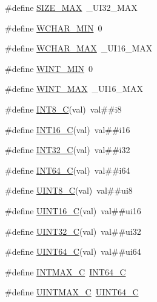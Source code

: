 \begin{DoxyCompactItemize}
\item 
\#define \hyperlink{lib-src_2ffmpeg_2win32_2stdint_8h_a3c75bb398badb69c7577b21486f9963f}{S\+I\+Z\+E\+\_\+\+M\+AX}~\+\_\+\+U\+I32\+\_\+\+M\+AX
\item 
\#define \hyperlink{lib-src_2ffmpeg_2win32_2stdint_8h_a051084d5ebcabf282d9ca9bb2b891a78}{W\+C\+H\+A\+R\+\_\+\+M\+IN}~0
\item 
\#define \hyperlink{lib-src_2ffmpeg_2win32_2stdint_8h_a2a823f3ccf2306cfbaa34d8addf66010}{W\+C\+H\+A\+R\+\_\+\+M\+AX}~\+\_\+\+U\+I16\+\_\+\+M\+AX
\item 
\#define \hyperlink{lib-src_2ffmpeg_2win32_2stdint_8h_a5285bc55170ae1701e599decacc7f001}{W\+I\+N\+T\+\_\+\+M\+IN}~0
\item 
\#define \hyperlink{lib-src_2ffmpeg_2win32_2stdint_8h_ad3f7b6bb8aa7d619017a91d3b2edc1ee}{W\+I\+N\+T\+\_\+\+M\+AX}~\+\_\+\+U\+I16\+\_\+\+M\+AX
\item 
\#define \hyperlink{lib-src_2ffmpeg_2win32_2stdint_8h_acf31df4f42272d793d752c4628c0f195}{I\+N\+T8\+\_\+C}(val)~val\#\#i8
\item 
\#define \hyperlink{lib-src_2ffmpeg_2win32_2stdint_8h_ab8c7ef9b034497b6cbd51a82eb22943b}{I\+N\+T16\+\_\+C}(val)~val\#\#i16
\item 
\#define \hyperlink{lib-src_2ffmpeg_2win32_2stdint_8h_a7df71d27f096826a76677178823f39bb}{I\+N\+T32\+\_\+C}(val)~val\#\#i32
\item 
\#define \hyperlink{lib-src_2ffmpeg_2win32_2stdint_8h_a095799ae3fe39d90cfbbe21ad4713318}{I\+N\+T64\+\_\+C}(val)~val\#\#i64
\item 
\#define \hyperlink{lib-src_2ffmpeg_2win32_2stdint_8h_a8caaafb4382e3c415f261b6580f0929d}{U\+I\+N\+T8\+\_\+C}(val)~val\#\#ui8
\item 
\#define \hyperlink{lib-src_2ffmpeg_2win32_2stdint_8h_ac8ab4bd1a0343acea9b7ed3e05c5ad13}{U\+I\+N\+T16\+\_\+C}(val)~val\#\#ui16
\item 
\#define \hyperlink{lib-src_2ffmpeg_2win32_2stdint_8h_a189f825ef34a1be844d384db2618ce12}{U\+I\+N\+T32\+\_\+C}(val)~val\#\#ui32
\item 
\#define \hyperlink{lib-src_2ffmpeg_2win32_2stdint_8h_a8da5373e041921aa34c2b6172ac3babc}{U\+I\+N\+T64\+\_\+C}(val)~val\#\#ui64
\item 
\#define \hyperlink{lib-src_2ffmpeg_2win32_2stdint_8h_ad558c804c227da1f8e1844e5314e80c5}{I\+N\+T\+M\+A\+X\+\_\+C}~\hyperlink{win_2_l_a_d_s_p_a__plugins-win_2glibc__includes_2stdint_8h_a22369e5d04efcda4162fdb0f5759318e}{I\+N\+T64\+\_\+C}
\item 
\#define \hyperlink{lib-src_2ffmpeg_2win32_2stdint_8h_ad7d1c8e3d3b8ba6eed942f6f7a0910db}{U\+I\+N\+T\+M\+A\+X\+\_\+C}~\hyperlink{win_2_l_a_d_s_p_a__plugins-win_2glibc__includes_2stdint_8h_a26a7bac63d90ef61175acb9f6fc4f2ca}{U\+I\+N\+T64\+\_\+C}
\end{DoxyCompactItemize}
